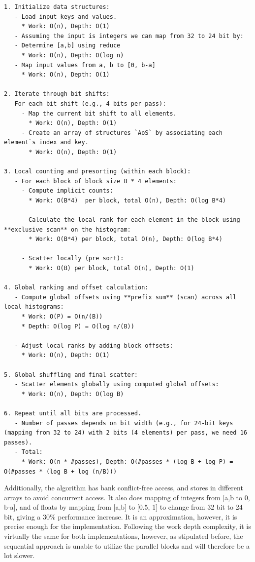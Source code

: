 \documentclass{article}
\begin{document}
\begin{lstlisting}
1. Initialize data structures:
   - Load input keys and values.
     * Work: O(n), Depth: O(1)
   - Assuming the input is integers we can map from 32 to 24 bit by:
   - Determine [a,b] using reduce
     * Work: O(n), Depth: O(log n)
   - Map input values from a, b to [0, b-a]
     * Work: O(n), Depth: O(1)
     
2. Iterate through bit shifts:
   For each bit shift (e.g., 4 bits per pass):
     - Map the current bit shift to all elements.
       * Work: O(n), Depth: O(1)
     - Create an array of structures `AoS` by associating each element`s index and key.
       * Work: O(n), Depth: O(1)

3. Local counting and presorting (within each block):
   - For each block of block size B * 4 elements:
     - Compute implicit counts:
       * Work: O(B*4)  per block, total O(n), Depth: O(log B*4)

     - Calculate the local rank for each element in the block using **exclusive scan** on the histogram:
       * Work: O(B*4) per block, total O(n), Depth: O(log B*4)

     - Scatter locally (pre sort):
       * Work: O(B) per block, total O(n), Depth: O(1)

4. Global ranking and offset calculation:
   - Compute global offsets using **prefix sum** (scan) across all local histograms:
     * Work: O(P) = O(n/(B))
     * Depth: O(log P) = O(log n/(B))

   - Adjust local ranks by adding block offsets:
     * Work: O(n), Depth: O(1)

5. Global shuffling and final scatter:
   - Scatter elements globally using computed global offsets:
     * Work: O(n), Depth: O(log B)

6. Repeat until all bits are processed.
   - Number of passes depends on bit width (e.g., for 24-bit keys (mapping from 32 to 24) with 2 bits (4 elements) per pass, we need 16 passes).
   - Total:
     * Work: O(n * #passes), Depth: O(#passes * (log B + log P) = O(#passes * (log B + log (n/B)))
\end{lstlisting}


Additionally, the algorithm has bank conflict-free access, and stores in different arrays to avoid concurrent access. It also does 
mapping of integers from [a,b to 0, b-a], and of floats by mapping from [a,b] to [0.5, 1] to change from 32 bit to 24 bit, giving a 30\% performance increase. It is an approximation, however, it is precise enough for the implementation. Following the work depth complexity, it is virtually the same for both implementations, however, as stipulated before, the sequential approach is unable to utilize the parallel blocks and will therefore be a lot slower. 
\end{document}
